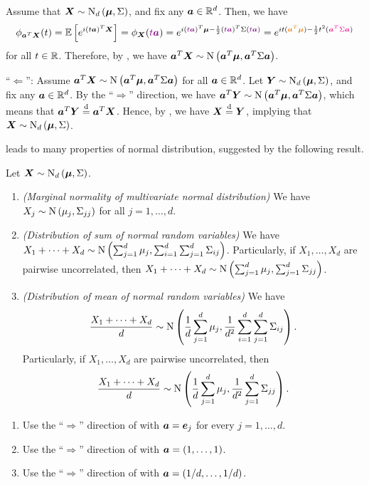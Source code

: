 \begin{enumerate}
\begin{pf}
Assume that \(\bm{X}\sim\operatorname{N}_{d}\left(\bm{\mu},\Sigma\right)\), and fix any
\(\bm{a}\in\mathbb{R}^{d}\). Then, we have
\[
\phi_{\vect{a}^{T}\vect{X}}(t)=\expv{e^{i(t\vect{a})^{T}\vect{X}}}
=\phi_{\vect{X}}(\vc{t\vect{a}})
=
e^{i(\vc{t\vect{a}})^{T}\vect{\mu}
-\frac{1}{2}(\vc{t\vect{a}})^{T}\Sigma(\vc{t\vect{a}})}
=e^{it(\orc{\vect{a}^{T}\vect{\mu}})
-\frac{1}{2}t^{2}(\mgc{\vect{a}^{T}\Sigma\vect{a}})}
\]
for all \(t\in\mathbb{R}\). Therefore, by , we have
\(\bm{a}^{T}\bm{X}\sim\operatorname{N}\left(\bm{a}^{T}\bm{\mu}
,\bm{a}^{T}\Sigma\bm{a}\right)\).

``\(\Leftarrow\)'': Assume \(\bm{a}^{T}\bm{X}
\sim\operatorname{N}\left(\bm{a}^{T}\bm{\mu},\bm{a}^{T}\Sigma\bm{a}\right)\) for all
\(\bm{a}\in\mathbb{R}^{d}\). Let \(\bm{Y}\sim\operatorname{N}_{d}\left(\bm{\mu},\Sigma\right)\), and fix
any \(\bm{a}\in\mathbb{R}^{d}\). By the ``\(\Rightarrow\)'' direction, we have
\(\bm{a}^{T}\bm{Y}\sim\operatorname{N}\left(\bm{a}^{T}\bm{\mu}
,\bm{a}^{T}\Sigma\bm{a}\right)\), which means that
\(\bm{a}^{T}\bm{Y}\overset{\text{d}}=\bm{a}^{T}\bm{X}\). Hence, by
, we have \(\bm{X}\overset{\text{d}}=\bm{Y}\), implying
that \(\bm{X}\sim\operatorname{N}_{d}\left(\bm{\mu},\Sigma\right)\).
\end{pf}

 leads to many properties of normal distribution,
suggested by the following result.
\begin{corollary}
\label{cor:norm-prop}
Let \(\bm{X}\sim\operatorname{N}_{d}\left(\bm{\mu},\Sigma\right)\).
\begin{enumerate}
\item \emph{(Marginal normality of multivariate normal distribution)} We have
\(X_j\sim\operatorname{N}\left(\mu_j, \Sigma_{jj}\right)\) for all \(j=1,\dotsc,d\).
\item \emph{(Distribution of sum of normal random variables)} We have
\(X_1+\dotsb+X_d\sim\operatorname{N}\left(\sum_{j=1}^{d}\mu_{j},
\sum_{i=1}^{d}\sum_{j=1}^{d}\Sigma_{ij}\right)\). Particularly, if \(X_1,\dotsc,X_d\)
are pairwise uncorrelated, then
\(X_1+\dotsb+X_d\sim\operatorname{N}\left(\sum_{j=1}^{d}\mu_{j},
\sum_{j=1}^{d}\Sigma_{jj}\right)
\).
\item \emph{(Distribution of mean of normal random variables)} We have
\[
\frac{X_1+\dotsb+X_d}{d}\sim\operatorname{N}\left(
\frac{1}{d}\sum_{j=1}^{d}\mu_{j},
\frac{1}{d^{2}}\sum_{i=1}^{d}\sum_{j=1}^{d}\Sigma_{ij}\right).
\]
Particularly, if \(X_1,\dotsc,X_d\) are pairwise uncorrelated, then
\[
\frac{X_1+\dotsb+X_d}{d}\sim
\operatorname{N}\left(\frac{1}{d}\sum_{j=1}^{d}\mu_{j}, 
\frac{1}{d^{2}}\sum_{j=1}^{d}\Sigma_{jj}\right).
\]
\end{enumerate}
\end{corollary}
\begin{pf}
\begin{enumerate}
\item Use the ``\(\Rightarrow\)'' direction of  with
\(\bm{a}=\bm{e}_j\) for every \(j=1,\dotsc,d\).
\item Use the ``\(\Rightarrow\)'' direction of  with
\(\bm{a}=(1,\dotsc,1)\).
\item Use the ``\(\Rightarrow\)'' direction of  with
\(\bm{a}=(1/d,\dotsc,1/d)\).
\end{enumerate}
\end{pf}
\end{enumerate}
